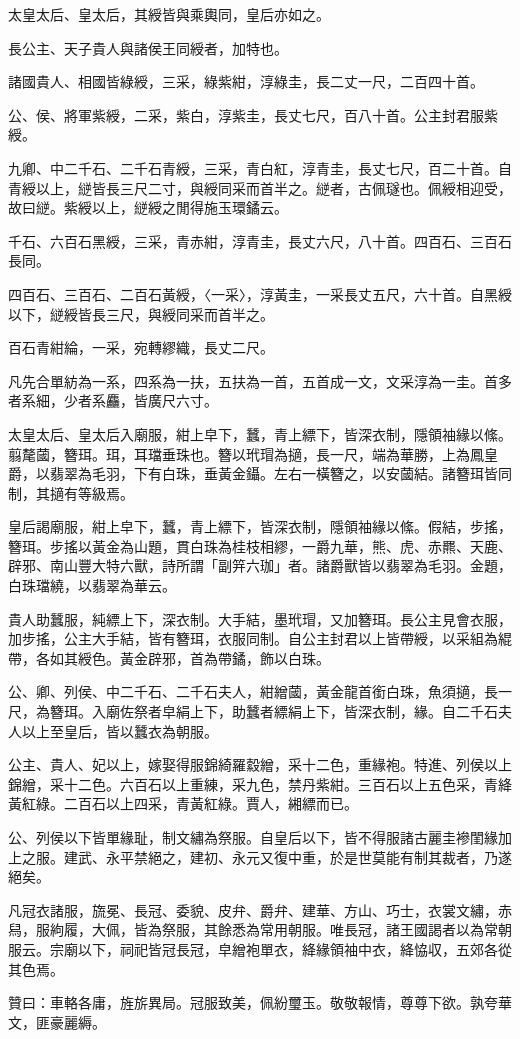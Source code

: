 \begin{pinyinscope}
太皇太后、皇太后，其綬皆與乘輿同，皇后亦如之。

長公主、天子貴人與諸侯王同綬者，加特也。

諸國貴人、相國皆綠綬，三采，綠紫紺，淳綠圭，長二丈一尺，二百四十首。

公、侯、將軍紫綬，二采，紫白，淳紫圭，長丈七尺，百八十首。公主封君服紫綬。

九卿、中二千石、二千石青綬，三采，青白紅，淳青圭，長丈七尺，百二十首。自青綬以上，縌皆長三尺二寸，與綬同采而首半之。縌者，古佩璲也。佩綬相迎受，故曰縌。紫綬以上，縌綬之閒得施玉環鐍云。

千石、六百石黑綬，三采，青赤紺，淳青圭，長丈六尺，八十首。四百石、三百石長同。

四百石、三百石、二百石黃綬，〈一采〉，淳黃圭，一采長丈五尺，六十首。自黑綬以下，縌綬皆長三尺，與綬同采而首半之。

百石青紺綸，一采，宛轉繆織，長丈二尺。

凡先合單紡為一系，四系為一扶，五扶為一首，五首成一文，文采淳為一圭。首多者系細，少者系麤，皆廣尺六寸。

太皇太后、皇太后入廟服，紺上皁下，蠶，青上縹下，皆深衣制，隱領袖緣以絛。翦氂蔮，簪珥。珥，耳璫垂珠也。簪以玳瑁為擿，長一尺，端為華勝，上為鳳皇爵，以翡翠為毛羽，下有白珠，垂黃金鑷。左右一橫簪之，以安蔮結。諸簪珥皆同制，其擿有等級焉。

皇后謁廟服，紺上皁下，蠶，青上縹下，皆深衣制，隱領袖緣以絛。假結，步搖，簪珥。步搖以黃金為山題，貫白珠為桂枝相繆，一爵九華，熊、虎、赤羆、天鹿、辟邪、南山豐大特六獸，詩所謂「副笄六珈」者。諸爵獸皆以翡翠為毛羽。金題，白珠璫繞，以翡翠為華云。

貴人助蠶服，純縹上下，深衣制。大手結，墨玳瑁，又加簪珥。長公主見會衣服，加步搖，公主大手結，皆有簪珥，衣服同制。自公主封君以上皆帶綬，以采組為緄帶，各如其綬色。黃金辟邪，首為帶鐍，飾以白珠。

公、卿、列侯、中二千石、二千石夫人，紺繒蔮，黃金龍首銜白珠，魚須擿，長一尺，為簪珥。入廟佐祭者皁絹上下，助蠶者縹絹上下，皆深衣制，緣。自二千石夫人以上至皇后，皆以蠶衣為朝服。

公主、貴人、妃以上，嫁娶得服錦綺羅縠繒，采十二色，重緣袍。特進、列侯以上錦繒，采十二色。六百石以上重練，采九色，禁丹紫紺。三百石以上五色采，青絳黃紅綠。二百石以上四采，青黃紅綠。賈人，緗縹而已。

公、列侯以下皆單緣耻，制文繡為祭服。自皇后以下，皆不得服諸古麗圭襂閨緣加上之服。建武、永平禁絕之，建初、永元又復中重，於是世莫能有制其裁者，乃遂絕矣。

凡冠衣諸服，旒冕、長冠、委貌、皮弁、爵弁、建華、方山、巧士，衣裳文繡，赤舄，服絇履，大佩，皆為祭服，其餘悉為常用朝服。唯長冠，諸王國謁者以為常朝服云。宗廟以下，祠祀皆冠長冠，皁繒袍單衣，絳緣領袖中衣，絳恊収，五郊各從其色焉。

贊曰：車輅各庸，旌旂異局。冠服致美，佩紛璽玉。敬敬報情，尊尊下欲。孰夸華文，匪豪麗縟。


\end{pinyinscope}
